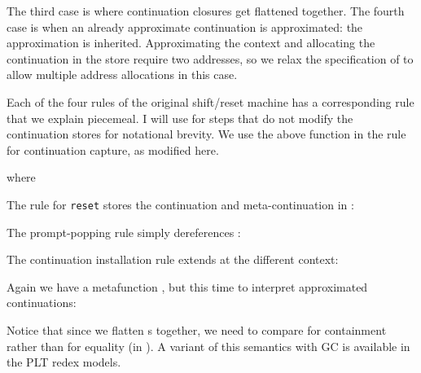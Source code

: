 The third case is where continuation closures get flattened together.
The fourth case is when an already approximate continuation is approximated: the approximation is inherited.
Approximating the context and allocating the continuation in the store require two addresses, so we relax the specification of  to allow multiple address allocations in this case.

Each of the four rules of the original shift/reset machine has a corresponding rule that we explain piecemeal.
I will use  for steps that do not modify the continuation stores for notational brevity.
We use the above  function in the rule for continuation capture, as modified here.

where


The rule for {\tt reset} stores the continuation and meta-continuation in :


The prompt-popping rule simply dereferences :


The continuation installation rule extends  at the different context:

Again we have a metafunction , but this time to interpret approximated continuations:

Notice that since we flatten s together, we need to compare for containment rather than for equality (in ).
A variant of this semantics with GC is available in the PLT redex models.

